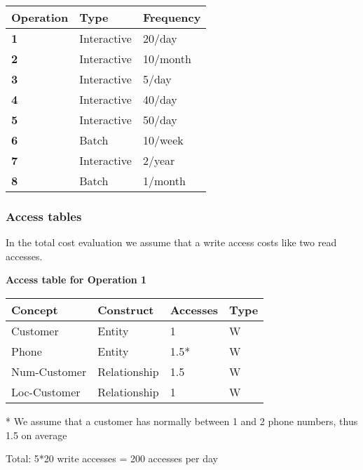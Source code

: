 {\begin{table}[H]
  \def\arraystretch{1.25}%
  \centering
  \begin{tabular}{ | m{2.5cm} | m{3.5cm}| m{3.5cm} |}
    \hline
    {\textbf{\large Operation}} & {\textbf{\large Type}} & {\textbf{\large Frequency}} \\
    \hline
    \color[HTML]{3531FF} \textbf{1} & Interactive & 20/day  \\
    \hline
    \color[HTML]{3531FF} \textbf{2} & Interactive & 10/month  \\
    \hline
    \color[HTML]{3531FF} \textbf{3} & Interactive & 5/day  \\
    \hline
    \color[HTML]{3531FF} \textbf{4} & Interactive & 40/day  \\
    \hline
    \color[HTML]{3531FF} \textbf{5} & Interactive & 50/day  \\
    \hline
    \color[HTML]{3531FF} \textbf{6} & Batch & 10/week  \\
    \hline
    \color[HTML]{3531FF} \textbf{7} & Interactive & 2/year  \\
    \hline
    \color[HTML]{3531FF} \textbf{8} & Batch & 1/month  \\
    \hline
  \end{tabular}
\end{table}

\pagebreak

\subsubsection{Access tables}

In the total cost evaluation we assume that a write access costs like two read accesses.

\vspace{12px}


{\centering \textbf{Access table for Operation 1}\\}
\begin{table}[H]
  \def\arraystretch{1.10}%
  \centering
  \begin{tabular}{ | m{4cm} | m{4cm}| m{3cm} | m{2cm} |}
    \hline
    {\textbf{\large Concept}} & {\textbf{\large Construct}} & {\textbf{\large Accesses}} & {\textbf{\large Type}} \\
    \hline
    \color[HTML]{3531FF} Customer & Entity & 1 & W \\
    \hline
    \color[HTML]{3531FF} Phone & Entity & 1.5* & W \\
    \hline
    \color[HTML]{3531FF} Num-Customer & Relationship & 1.5 & W \\
    \hline
    \color[HTML]{3531FF} Loc-Customer & Relationship & 1 & W \\
    \hline
  \end{tabular}
  * \small{We assume that a customer has normally between 1 and 2 phone numbers, thus 1.5 on average}
\end{table}
Total: 5*20 write accesses = 200 accesses per day

}
